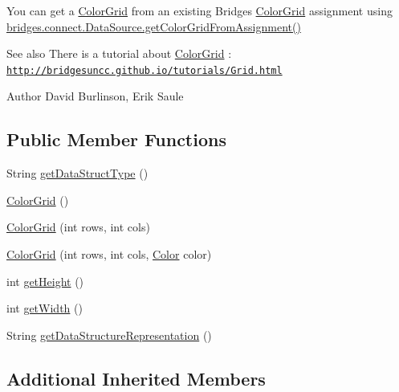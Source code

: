 You can get a \mbox{\hyperlink{classbridges_1_1base_1_1_color_grid}{Color\+Grid}} from an existing Bridges \mbox{\hyperlink{classbridges_1_1base_1_1_color_grid}{Color\+Grid}} assignment using \mbox{\hyperlink{classbridges_1_1connect_1_1_data_source_a9556950d89b39ce61bead0879d1e2192}{bridges.\+connect.\+Data\+Source.\+get\+Color\+Grid\+From\+Assignment()}}

\begin{DoxySeeAlso}{See also}
There is a tutorial about \mbox{\hyperlink{classbridges_1_1base_1_1_color_grid}{Color\+Grid}} \+: \href{http://bridgesuncc.github.io/tutorials/Grid.html}{\tt http\+://bridgesuncc.\+github.\+io/tutorials/\+Grid.\+html}
\end{DoxySeeAlso}
\begin{DoxyAuthor}{Author}
David Burlinson, Erik Saule 
\end{DoxyAuthor}
\subsection*{Public Member Functions}
\begin{DoxyCompactItemize}
\item 
String \mbox{\hyperlink{classbridges_1_1base_1_1_color_grid_a53a1f3f105f8545796f98e5fac559b5b}{get\+Data\+Struct\+Type}} ()
\item 
\mbox{\hyperlink{classbridges_1_1base_1_1_color_grid_af434a5a3dcbaf86e51ac6f9e1c1d7e5f}{Color\+Grid}} ()
\item 
\mbox{\hyperlink{classbridges_1_1base_1_1_color_grid_aafb4157a4c8129f30c1f989fcdfda544}{Color\+Grid}} (int rows, int cols)
\item 
\mbox{\hyperlink{classbridges_1_1base_1_1_color_grid_aef40242c93b66ab851e6afa64cada0b5}{Color\+Grid}} (int rows, int cols, \mbox{\hyperlink{classbridges_1_1base_1_1_color}{Color}} color)
\item 
int \mbox{\hyperlink{classbridges_1_1base_1_1_color_grid_a8793791e35f03b3e5a2e5ef3606ac124}{get\+Height}} ()
\item 
int \mbox{\hyperlink{classbridges_1_1base_1_1_color_grid_af872226de86ac8e8f2553fdc5bddc375}{get\+Width}} ()
\item 
String \mbox{\hyperlink{classbridges_1_1base_1_1_color_grid_a81ca0995d17b6cb31122b718dfa57286}{get\+Data\+Structure\+Representation}} ()
\end{DoxyCompactItemize}
\subsection*{Additional Inherited Members}


